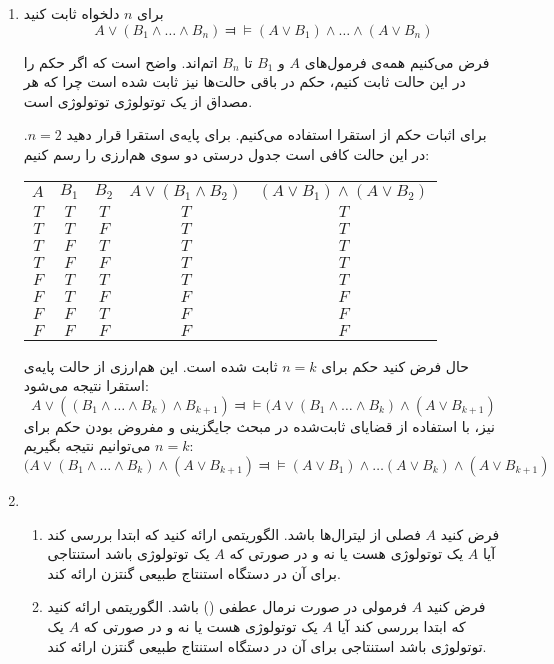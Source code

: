 \documentclass[12pt, 14paper]{article}
\begin{document}
\begin{enumerate}
\begin{ans}
\begin{enumerate}
\end{enumerate}
\end{ans}

\item
برای $n$ دلخواه ثابت کنید
$$
A\vee (B_1\wedge\ldots\wedge B_n)\Dashv\vDash(A\vee B_1)\wedge\ldots\wedge(A\vee B_n)
$$

\begin{ans}
فرض می‌کنیم همه‌ی فرمول‌های $A$ و $B_1$ تا $B_n$ اتم‌اند. واضح است که اگر حکم را در این حالت ثابت کنیم، حکم در باقی حالت‌ها نیز ثابت شده است چرا که هر مصداق از یک توتولوژی توتولوژی است.

برای اثبات حکم از استقرا استفاده می‌کنیم. برای پایه‌ی استقرا قرار دهید $n=2$. در این حالت کافی است جدول درستی دو سوی هم‌ارزی را رسم کنیم:

\begin{tabular}{c|c|c|c|c}
$A$ & $B_1$ & $B_2$ & $A\vee(B_1\wedge B_2)$ & $(A\vee B_1)\wedge(A\vee B_2)$ \\
$T$ & $T$ & $T$ & $T$ & $T$ \\
$T$ & $T$ & $F$ & $T$ & $T$ \\
$T$ & $F$ & $T$ & $T$ & $T$ \\
$T$ & $F$ & $F$ & $T$ & $T$ \\
$F$ & $T$ & $T$ & $T$ & $T$ \\
$F$ & $T$ & $F$ & $F$ & $F$ \\
$F$ & $F$ & $T$ & $F$ & $F$ \\
$F$ & $F$ & $F$ & $F$ & $F$ \\
\end{tabular}

حال فرض کنید حکم برای $n=k$ ثابت شده است. این هم‌ارزی از حالت پایه‌ی استقرا نتیجه می‌شود:
$$
A\vee ((B_1\wedge\ldots\wedge B_k)\wedge B_{k+1})\Dashv\vDash (A\vee (B_1\wedge\ldots\wedge B_k)\wedge (A\vee B_{k+1})
$$
نیز، با استفاده از قضایای ثابت‌شده در مبحث جایگزینی و مفروض بودن حکم برای $n=k$ می‌توانیم نتیجه بگیریم:
$$
(A\vee (B_1\wedge\ldots\wedge B_k)\wedge (A\vee B_{k+1})\Dashv\vDash(A\vee B_1)\wedge\ldots(A\vee B_k)\wedge(A\vee B_{k+1})
$$

\end{ans}

\item
\begin{enumerate}
\item
فرض کنید $A$ فصلی از لیترال‌ها باشد. الگوریتمی ارائه کنید که ابتدا بررسی کند آیا $A$ یک توتولوژی هست یا نه و در صورتی که $A$ یک توتولوژی باشد استنتاجی برای آن در دستگاه استنتاج طبیعی گنتزن ارائه کند.
\item
فرض کنید $A$ فرمولی در صورت نرمال عطفی () باشد. الگوریتمی ارائه کنید که ابتدا بررسی کند آیا $A$ یک توتولوژی هست یا نه و در صورتی که $A$ یک توتولوژی باشد استنتاجی برای آن در دستگاه استنتاج طبیعی گنتزن ارائه کند.
\end{enumerate}


\end{enumerate}
\end{document}
